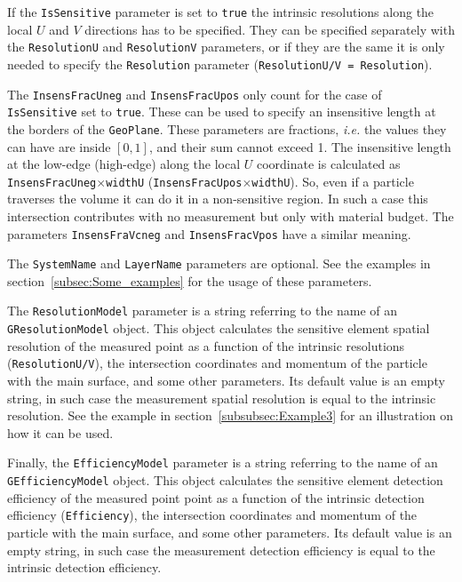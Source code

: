 If the {\tt IsSensitive} parameter is set to {\tt true} the intrinsic resolutions along the local $U$ and $V$ directions 
has to be specified. They can be specified separately with the {\tt ResolutionU} and {\tt ResolutionV} parameters, or if 
they are the same it is only needed to specify the {\tt Resolution} parameter ({\tt ResolutionU/V = Resolution}).

The {\tt InsensFracUneg} and {\tt InsensFracUpos} only count for the case of {\tt IsSensitive} set to {\tt true}. These can be used to specify 
an insensitive length at the borders of the {\tt GeoPlane}. These parameters are fractions, {\it i.e.} the values they can have are inside
$[0,1]$, and their sum cannot exceed 1. The insensitive length at the low-edge (high-edge) along the local $U$ coordinate is calculated as 
{\tt InsensFracUneg}$\times${\tt widthU} ({\tt InsensFracUpos}$\times${\tt widthU}). So, even if a particle traverses the volume it can do it 
in a non-sensitive region. In such a case this intersection contributes with no measurement but only with material budget.
The parameters {\tt InsensFraVcneg} and {\tt InsensFracVpos} have a similar meaning.

The {\tt SystemName} and {\tt LayerName} parameters are optional. See the examples in section~\ref{subsec:Some_examples} for 
the usage of these parameters.

The {\tt ResolutionModel} parameter is a string referring to the name of an {\tt GResolutionModel} object. This object calculates 
the sensitive element spatial resolution of the measured point as a function of the intrinsic resolutions ({\tt ResolutionU/V}), 
the intersection coordinates and momentum of the particle with the main surface, and some other parameters. Its default value is an 
empty string, in such case the measurement spatial resolution is equal to the intrinsic resolution. See the example in 
section~\ref{subsubsec:Example3} for an illustration on how it can be used.

Finally, the {\tt EfficiencyModel} parameter is a string referring to the name of an {\tt GEfficiencyModel} object. This object 
calculates the sensitive element detection efficiency of the measured point point as a function of the intrinsic detection efficiency 
({\tt Efficiency}), the intersection coordinates and momentum of the particle with the main surface, and some other parameters. Its default 
value is an empty string, in such case the measurement detection efficiency is equal to the intrinsic detection efficiency.

